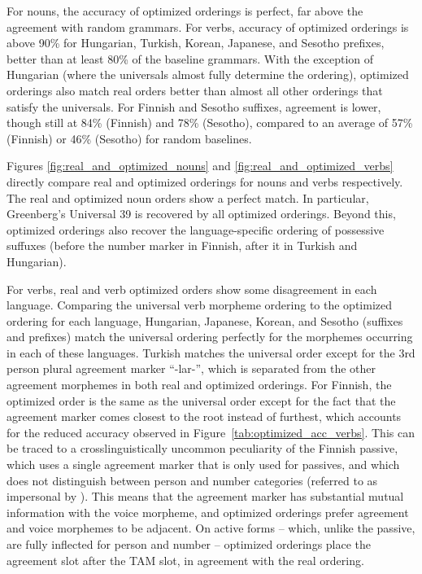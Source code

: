 \documentclass[11pt,letterpaper]{article}
\newcommand{\citet}{\Textcite}
\begin{document}
For nouns, the accuracy of optimized orderings is perfect, far above the agreement with random grammars.
For verbs, accuracy of optimized orderings is above 90\% for Hungarian, Turkish, Korean, Japanese, and Sesotho prefixes, better than at least 80\% of the baseline grammars. 
With the exception of Hungarian (where the universals almost fully determine the ordering), optimized orderings also match real orders better than almost all other orderings that satisfy the universals.
For Finnish and Sesotho suffixes, agreement is lower, though still at 84\% (Finnish) and 78\% (Sesotho), compared to an average of 57\% (Finnish) or 46\% (Sesotho) for random baselines.

Figures \ref{fig:real_and_optimized_nouns} and \ref{fig:real_and_optimized_verbs} directly compare real and optimized orderings for nouns and verbs respectively.
The real and optimized noun orders show a perfect match.
In particular, Greenberg's Universal 39 is recovered by all optimized orderings.
Beyond this, optimized orderings also recover the language-specific ordering of possessive suffuxes (before the number marker in Finnish, after it in Turkish and Hungarian).

For verbs, real and verb optimized orders show some disagreement in each language.
Comparing the universal verb morpheme ordering to the optimized ordering for each language, Hungarian, Japanese, Korean, and Sesotho (suffixes and prefixes) match the universal ordering perfectly for the morphemes occurring in each of these languages. 
Turkish matches the universal order except for the 3rd person plural agreement marker ``-lar-'', which is separated from the other agreement morphemes in both real and optimized orderings.
For Finnish, the optimized order is the same as the universal order except for the fact that the agreement marker comes closest to the root instead of furthest, which accounts for the reduced accuracy observed in Figure~\ref{tab:optimized_acc_verbs}.
This can be traced to a crosslinguistically uncommon peculiarity of the Finnish passive, which uses a single agreement marker that is only used for passives, and which does not distinguish between person and number categories (referred to as impersonal by \citet[Section 69]{karlsson1999finnish}).
This means that the agreement marker has substantial mutual information with the voice morpheme, and optimized orderings prefer agreement and voice morphemes to be adjacent.
On active forms -- which, unlike the passive, are fully inflected for person and number -- optimized orderings place the agreement slot after the TAM slot, in agreement with the real ordering.
\end{document}
